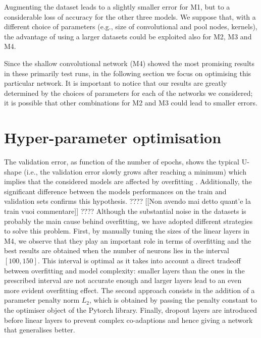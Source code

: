 \documentclass{article}
\begin{document}
Augmenting the dataset leads to a slightly smaller error for M1, but to a considerable loss of accuracy for the other three models. 
We suppose that, with a different choice of parameters (e.g., size of convolutional and pool nodes, kernels), the advantage of using a larger datasets could be exploited also for M2, M3 and M4. 

Since the shallow convolutional network (M4) showed the most promising results in these primarily test runs, in the following section we focus on optimising this particular network. 
It is important to notice that our results  are greatly determined by the choices of parameters for each of the networks we considered; it is possible that other combinations for M2 and M3 could lead to smaller errors.


  \section{Hyper-parameter optimisation}\label{sec_themodel}
 The validation error, as function of the number of epochs, shows the typical U-shape (i.e., the  validation error slowly grows after reaching a minimum) which implies  that the considered models are affected by overfitting \cite{goodfellow2016deep}. 
 Additionally, the significant difference between the models performances on the train and validation sets confirms this hypothesis. ???? [[Non avendo mai detto quant'e la train vuoi commentare]] ????
Although the substantial noise  in the datasets is probably the main cause behind overfitting, we have adopted different strategies to solve this problem. 
First, by manually tuning the sizes of the linear layers in M4, we observe that they play an important role in terms of overfitting and the best results are obtained when the number of neurons lies in the interval $[100,150]$. 
This interval is optimal as it takes into account a direct tradeoff between overfitting and model complexity: smaller layers  than the ones in the prescribed interval are not accurate enough and larger layers lead to an even  more evident overfitting effect. 
The second approach consists in the addition of a parameter penalty norm $L_2$, which is obtained by passing the penalty constant to the optimiser object of the Pytorch library. 
Finally, dropout layers are introduced before linear layers to prevent complex co-adaptions and hence giving a network that generalises better.
\end{document}
